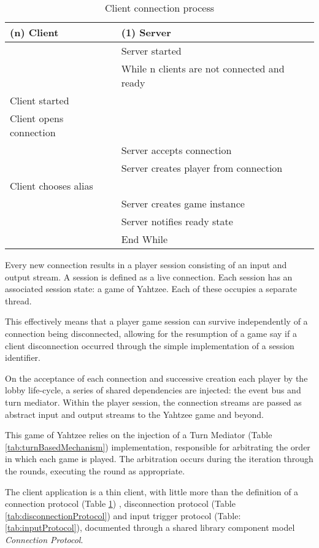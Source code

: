 \begin{table}[H]
	\centering
	\begin{tabular}{ | l | l | }
		\hline
		(n) Client & (1) Server \\
		\hline
		\hline
		 & Server started \\
		 \hline
		 & While n clients are not connected and ready \\
		 \hline
		 Client started  & \\
		 \hline
		Client opens connection & \\
		 \hline
		 & Server accepts connection \\
		 \hline
		 & Server creates player from connection  \\
		 \hline
		Client chooses alias & \\
		 \hline
		& Server creates game instance \\
		\hline
		& Server notifies ready state  \\
		 \hline
		& End While \\
		\hline
	\end{tabular}
	\caption{Client connection process}
	\label{tab:connectionProtocol}
\end{table}

Every new connection results in a player session consisting of an input and output stream. A session is defined as a live connection. Each session has an associated session state: a game of Yahtzee. Each of these occupies a separate thread.

This effectively means that a player game session can survive independently of a connection being disconnected, allowing for the resumption of a game say if a client disconnection occurred through the simple implementation of a session identifier. %

On the acceptance of each connection and successive creation each player by the lobby life-cycle, a series of shared dependencies are injected: the event bus and turn mediator. Within the player session, the connection streams are passed as abstract input and output streams to the Yahtzee game and beyond.

This game of Yahtzee relies on the injection of a Turn Mediator (Table \ref{tab:turnBasedMechanism}) implementation, responsible for arbitrating the order in which each game is played. The arbitration occurs during the iteration through the rounds, executing the round as appropriate.

The client application is a thin client, with little more than the definition of a connection protocol (Table \ref{tab:connectionProtocol}) , disconnection protocol (Table \ref{tab:disconnectionProtocol}) and input trigger protocol (Table: \ref{tab:inputProtocol}), documented through a shared library component model \textit{Connection Protocol}.

